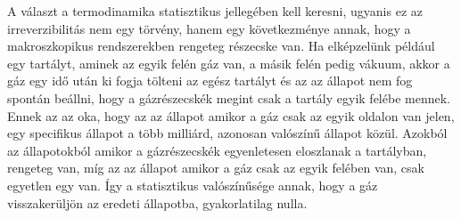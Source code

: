 \documentclass[a4paper,12pt]{article}
\begin{document}
A választ a termodinamika statisztikus jellegében kell keresni, ugyanis ez az irreverzibilitás nem egy törvény, hanem egy következménye annak, hogy a makroszkopikus rendszerekben rengeteg részecske van.
Ha elképzelünk például egy tartályt, aminek az egyik felén gáz van, a másik felén pedig vákuum, akkor a gáz egy idő után ki fogja tölteni az egész tartályt és az az állapot nem fog spontán beállni, hogy a gázrészecskék megint csak a tartály egyik felébe mennek.
Ennek az az oka, hogy az az állapot amikor a gáz csak az egyik oldalon van jelen, egy specifikus állapot a több milliárd, azonosan valószínű állapot közül. Azokból az állapotokból amikor a gázrészecskék egyenletesen eloszlanak a tartályban,
rengeteg van, míg az az állapot amikor a gáz csak az egyik felében van, csak egyetlen egy van. Így a statisztikus valószínűsége annak, hogy a gáz visszakerüljön az eredeti állapotba, gyakorlatilag nulla.
\end{document}
